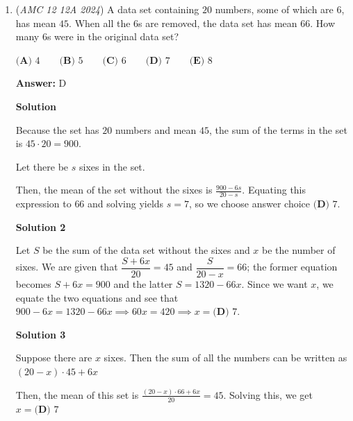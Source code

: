 \begin{enumerate}
 Note that $2024$ is $2025 -1$, which is $45^2 -1 = (45+1)(45-1) = 46 \cdot 44 = 2^3 \cdot 11 \cdot 23$.

 <u>\textbf{Remark}</u>

 Another way to check if you don't remember the prime factorization is to factor to the best of your ability and then check the answer choices for another factor. In this case, $2024 = 253 \cdot 2^3$, then check the answer choice for anything that can be multiplied out, $253 = 11 \cdot 23$, so $2024 = 11 \cdot 23 \cdot 2^3$.

 


	\item (\textit{AMC 12 12A 2024}) A data set containing $20$ numbers, some of which are $6$, has mean $45$. When all the 6s are removed, the data set has mean $66$. How many 6s were in the original data set?


 $\textbf{(A) }4\qquad\textbf{(B) }5\qquad\textbf{(C) }6\qquad\textbf{(D) }7\qquad\textbf{(E) }8$

 \textbf{Answer: }D



\textbf{Solution}

Because the set has $20$ numbers and mean $45$, the sum of the terms in the set is $45\cdot 20=900$.

 Let there be $s$ sixes in the set.

 Then, the mean of the set without the sixes is $\frac{900-6s}{20-s}$. Equating this expression to $66$ and solving yields $s=7$, so we choose answer choice $\boxed{\textbf{(D) }7}$.

 



\textbf{Solution 2}

Let $S$ be the sum of the data set without the sixes and $x$ be the number of sixes. We are given that $\dfrac{S+6x}{20}=45$ and $\dfrac S{20-x}=66$; the former equation becomes $S+6x=900$ and the latter $S=1320-66x$. Since we want $x$, we equate the two equations and see that $900-6x=1320-66x\implies60x=420\implies x=\boxed{\textbf{(D) }7}$. 

 



\textbf{Solution 3}

Suppose there are $x$ sixes. Then the sum of all the numbers can be written as $(20-x)\cdot 45+6x$

 Then, the mean of this set is $\frac{(20-x)\cdot 66+6x}{20}=45$. Solving this, we get $x=\boxed{\textbf{(D) }7}$




\end{enumerate}

